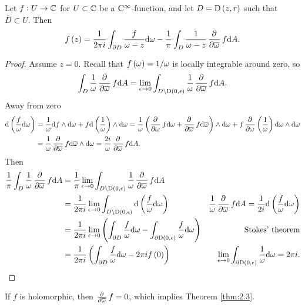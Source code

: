 \begin{proposition}
Let $ f : U \to \mathbb{C} $ for $ U \subset \mathbb{C} $ be a $ \mathrm{C}^\infty $-function, and let $ D = \D\br{z, r} $ such that $ \overline{D} \subset U $. Then
$$ f\br{z} = \dfrac{1}{2\pi i}\int_{\partial D} \dfrac{f}{\omega - z}\d\omega - \dfrac{1}{\pi}\int_D \dfrac{1}{\omega - z}\dpd{}{\overline{\omega}}f\d A. $$
\end{proposition}

\begin{proof}
Assume $ z = 0 $. Recall that $ f\br{\omega} = 1 / \omega $ is locally integrable around zero, so
$$ \int_D \dfrac{1}{\omega}\dpd{}{\overline{\omega}}f\d A = \lim_{\epsilon \to 0} \int_{D \setminus \D\br{0, \epsilon}} \dfrac{1}{\omega}\dpd{}{\overline{\omega}}f\d A. $$
Away from zero
\begin{align*}
\d\br{\dfrac{f}{\omega}\d\omega}
& = \dfrac{1}{\omega}\d f \wedge \d\omega + f\d\br{\dfrac{1}{\omega}} \wedge \d\omega
= \dfrac{1}{\omega} \br{\dpd{}{\omega}f\d\omega + \dpd{}{\overline{\omega}}f\d\overline{\omega}} \wedge \d\omega + f\dpd{}{\omega}\br{\dfrac{1}{\omega}}\d\omega \wedge \d\omega \\
& = \dfrac{1}{\omega}\dpd{}{\overline{\omega}}f\d\overline{\omega} \wedge \d\omega
= \dfrac{2i}{\omega}\dpd{}{\overline{\omega}}f\d A.
\end{align*}
Then
\begin{align*}
\dfrac{1}{\pi}\int_D \dfrac{1}{\omega}\dpd{}{\overline{\omega}}f\d A
& = \dfrac{1}{\pi}\lim_{\epsilon \to 0} \int_{D \setminus \D\br{0, \epsilon}} \dfrac{1}{\omega}\dpd{}{\overline{\omega}}f\d A \\
& = \dfrac{1}{2\pi i}\lim_{\epsilon \to 0} \int_{D \setminus \D\br{0, \epsilon}}\d\br{\dfrac{f}{\omega}\d\omega} & \dfrac{1}{\omega}\dpd{}{\overline{\omega}}f\d A = \dfrac{1}{2i}\d\br{\dfrac{f}{\omega}\d\omega} \\
& = \dfrac{1}{2\pi i}\lim_{\epsilon \to 0} \br{\int_{\partial D} \dfrac{f}{\omega}\d\omega - \int_{\partial\D\br{0, \epsilon}} \dfrac{f}{\omega}\d\omega} & \text{Stokes' theorem} \\
& = \dfrac{1}{2\pi i}\br{\int_{\partial D} \dfrac{f}{\omega}\d\omega - 2\pi if\br{0}} & \lim_{\epsilon \to 0} \int_{\partial\D\br{0, \epsilon}} \dfrac{1}{\omega}\d\omega = 2\pi i.
\end{align*}
\end{proof}

If $ f $ is holomorphic, then $ \tpd{}{\overline{\omega}}f = 0 $, which implies Theorem \ref{thm:2.3}.

